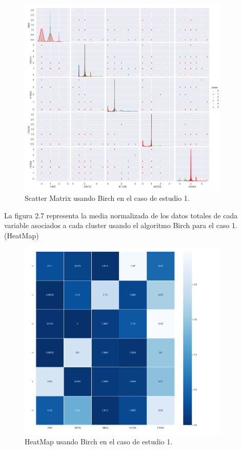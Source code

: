 	\begin{figure}[htb]
		\centering
		\includegraphics[width=0.9\textwidth]{./imagenes/caso1/scatterMatrix_caso1_Birch}
		\caption{Scatter Matrix usando Birch en el caso de estudio 1.} \label{fig:1}
	\end{figure}

	La figura 2.7 representa la media normalizada de los datos totales de cada variable asociados
	a cada cluster usando el algoritmo Birch para el caso 1. (HeatMap) \\

	\begin{figure}[htb]
		\centering
		\includegraphics[width=0.9\textwidth]{./imagenes/caso1/heatmap_caso1_Birch}
		\caption{HeatMap usando Birch en el caso de estudio 1.} \label{fig:1}
	\end{figure}

